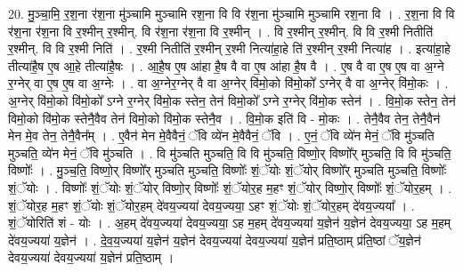 \documentclass[17pt]{extarticle}
\begin{document}
20. मु॒ञ्चा॒मि॒ र॒श॒ना र॑श॒ना मु॑ञ्चामि मुञ्चामि रश॒ना वि वि र॑श॒ना मु॑ञ्चामि मुञ्चामि रश॒ना वि । . र॒श॒ना वि वि र॑श॒ना र॑श॒ना वि र॒श्मीन् र॒श्मीन्. वि र॑श॒ना र॑श॒ना वि र॒श्मीन् । . वि र॒श्मीन् र॒श्मीन्. वि वि र॒श्मी नितीति॑ र॒श्मीन्. वि वि र॒श्मी निति॑ । . र॒श्मी नितीति॑ र॒श्मीन् र॒श्मी नित्या॑हा॒हे ति॑ र॒श्मीन् र॒श्मी नित्या॑ह । . इत्या॑हा॒हे तीत्या॑है॒ष ए॒ष आ॒हे तीत्या॑है॒षः । . आ॒है॒ष ए॒ष आ॑हा है॒ष वै वा ए॒ष आ॑हा है॒ष वै । . ए॒ष वै वा ए॒ष ए॒ष वा अ॒ग्ने र॒ग्नेर् वा ए॒ष ए॒ष वा अ॒ग्नेः । . वा अ॒ग्नेर॒ग्नेर् वै वा अ॒ग्नेर् वि॑मो॒को वि॑मो॒को᳚ ऽग्नेर् वै वा अ॒ग्नेर् वि॑मो॒कः । . अ॒ग्नेर् वि॑मो॒को वि॑मो॒को᳚ ऽग्ने र॒ग्नेर् वि॑मो॒क स्तेन॒ तेन॑ विमो॒को᳚ ऽग्ने र॒ग्नेर् वि॑मो॒क स्तेन॑ । . वि॒मो॒क स्तेन॒ तेन॑ विमो॒को वि॑मो॒क स्तेनै॒वैव तेन॑ विमो॒को वि॑मो॒क स्तेनै॒व । . वि॒मो॒क इति॑ वि - मो॒कः । . तेनै॒वैव तेन॒ तेनै॒वैन॑ मेन मे॒व तेन॒ तेनै॒वैन᳚म् । . ए॒वैन॑ मेन मे॒वैवैनं॒ ॅवि व्ये॑न मे॒वैवैनं॒ ॅवि । . ए॒नं॒ ॅवि व्ये॑न मेनं॒ ॅवि मु॑ञ्चति मुञ्चति॒ व्ये॑न मेनं॒ ॅवि मु॑ञ्चति । . वि मु॑ञ्चति मुञ्चति॒ वि वि मु॑ञ्चति॒ विष्णो॒र् विष्णो᳚र् मुञ्चति॒ वि वि मु॑ञ्चति॒ विष्णोः᳚ । . मु॒ञ्च॒ति॒ विष्णो॒र् विष्णो᳚र् मुञ्चति मुञ्चति॒ विष्णोः᳚ शं॒ॅयोः शं॒ॅयोर् विष्णो᳚र् मुञ्चति मुञ्चति॒ विष्णोः᳚ शं॒ॅयोः । . विष्णोः᳚ शं॒ॅयोः शं॒ॅयोर् विष्णो॒र् विष्णोः᳚ शं॒ॅयोर॒ह म॒हꣳ शं॒ॅयोर् विष्णो॒र् विष्णोः᳚ शं॒ॅयोर॒हम् । . शं॒ॅयोर॒ह म॒हꣳ शं॒ॅयोः शं॒ॅयोर॒हम् दे॑वय॒ज्यया॑ देवय॒ज्यया॒ ऽहꣳ शं॒ॅयोः शं॒ॅयोर॒हम् दे॑वय॒ज्यया᳚ । . शं॒ॅयोरिति॑ शं - योः । . अ॒हम् दे॑वय॒ज्यया॑ देवय॒ज्यया॒ ऽह म॒हम् दे॑वय॒ज्यया॑ य॒ज्ञेन॑ य॒ज्ञेन॑ देवय॒ज्यया॒ ऽह म॒हम् दे॑वय॒ज्यया॑ य॒ज्ञेन॑ । . दे॒व॒य॒ज्यया॑ य॒ज्ञेन॑ य॒ज्ञेन॑ देवय॒ज्यया॑ देवय॒ज्यया॑ य॒ज्ञेन॑ प्रति॒ष्ठाम् प्र॑ति॒ष्ठां ॅय॒ज्ञेन॑ देवय॒ज्यया॑ देवय॒ज्यया॑ य॒ज्ञेन॑ प्रति॒ष्ठाम् । \newline
\end{document}

